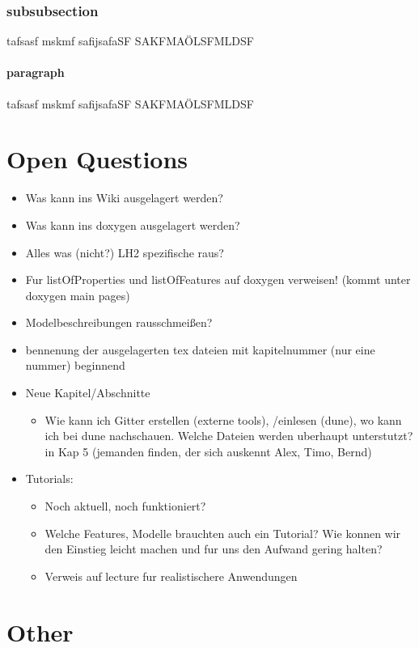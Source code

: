 \subsubsection{subsubsection}
tafsasf mskmf safijsafaSF SAKFMAÖLSFMLDSF 

\paragraph{paragraph}
tafsasf mskmf safijsafaSF SAKFMAÖLSFMLDSF 

\section{Open Questions}
\begin{itemize}
  \item Was kann ins Wiki ausgelagert werden?
  \item Was kann ins doxygen ausgelagert werden?
  \item Alles was (nicht?) LH2 spezifische raus?
  \item Fur listOfProperties und listOfFeatures auf doxygen verweisen! (kommt
        unter doxygen main pages)
  \item Modelbeschreibungen rausschmeißen?
  \item bennenung der ausgelagerten tex dateien mit kapitelnummer (nur eine nummer)
        beginnend
  \item Neue Kapitel/Abschnitte
  \begin{itemize}
    \item Wie kann ich Gitter erstellen (externe tools), /einlesen (dune), wo
          kann ich bei dune nachschauen. Welche Dateien werden uberhaupt unterstutzt?
          in Kap 5 (jemanden finden, der sich auskennt Alex, Timo, Bernd)
  \end{itemize}
  \item Tutorials:
  \begin{itemize}
    \item Noch aktuell, noch funktioniert?
    \item Welche Features, Modelle brauchten auch ein Tutorial? Wie konnen wir
          den Einstieg leicht machen und fur uns den Aufwand gering halten?
    \item Verweis auf lecture fur realistischere Anwendungen
  \end{itemize}
\end{itemize}

\section{Other}

